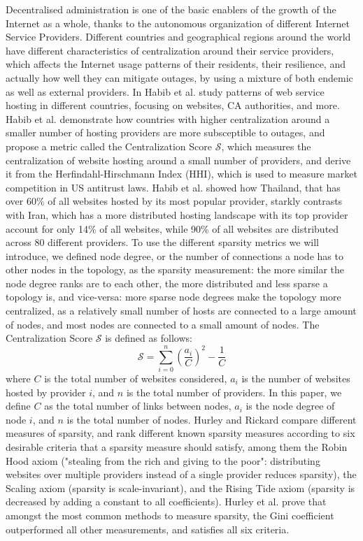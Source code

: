 Decentralised administration is one of the basic enablers of the growth of the Internet as a whole, thanks to the autonomous organization of different Internet Service Providers.
Different countries and geographical regions around the world have different characteristics of centralization around their service providers, which affects the Internet usage patterns of their residents, their resilience, and actually how well they can mitigate outages, by using a mixture of both endemic as well as external providers.
In \cite{dependence} Habib et al. study patterns of web service hosting in different countries, focusing on websites, CA authorities, and more. Habib et al. demonstrate how countries with higher centralization around a smaller number of hosting providers are more subsceptible to outages, and propose a metric called the Centralization Score $\mathcal{S}$, which measures the centralization of website hosting around a small number of providers, and derive it from the Herfindahl-Hirschmann Index (HHI), which is used to measure market competition in US antitrust laws.
Habib et al. showed how Thailand, that has over 60\% of all websites hosted by its most popular provider, starkly contrasts with Iran, which has a more distributed hosting landscape with its top provider account for only 14\% of all websites, while 90\% of all websites are distributed across 80 different providers.
To use the different sparsity metrics we will introduce, we defined node degree, or the number of connections a node has to other nodes in the topology, as the sparsity measurement: the more similar the node degree ranks are to each other, the more distributed and less sparse a topology is, and vice-versa: more sparse node degrees make the topology more centralized, as a relatively small number of hosts are connected to a large amount of nodes, and most nodes are connected to a small amount of nodes.
The Centralization Score $\mathcal{S}$ is defined as follows:
$$
\mathcal{S} = \sum_{i=0}^n (\frac{a_i}{C})^2 - \frac{1}{C}
$$
where $C$ is the total number of websites considered, $a_i$ is the number of websites hosted by provider $i$, and $n$ is the total number of providers.
In this paper, we define $C$ as the total number of links between nodes, $a_i$ is the node degree of node $i$, and $n$ is the total number of nodes.
Hurley and Rickard compare different measures of sparsity\cite{sparsity}, and rank different known sparsity measures according to six desirable criteria that a sparsity measure should satisfy, among them the Robin Hood axiom ("stealing from the rich and giving to the poor": distributing websites over multiple providers instead of a single provider reduces sparsity), the Scaling axiom (sparsity is scale-invariant), and the Rising Tide axiom (sparsity is decreased by adding a constant to all coefficients). Hurley et al. prove that amongst the most common methods to measure sparsity, the Gini coefficient outperformed all other measurements, and satisfies all six criteria.
